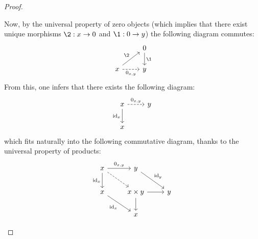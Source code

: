 \begin{proof}
\begin{enumerate}
                                    Now, by the universal property of zero objects (which implies that there exist unique morphisms $\2: x \to 0$ and $\1: 0 \to y$) the following diagram commutes:
                                        $$
                                            \begin{tikzcd}
                                                                                                   & 0 \arrow[d, "\1"] \\
                                                x \arrow[r, "{0_{x, y}}"', dashed] \arrow[ru, "\2"] & y                
                                            \end{tikzcd}
                                        $$
                                    From this, one infers that there exists the following diagram:
                                        $$
                                            \begin{tikzcd}
                                                x \arrow[r, "{0_{x, y}}", dashed] \arrow[d, "\id_x"'] & y \\
                                                x                                                     &  
                                            \end{tikzcd}
                                        $$
                                    which fits naturally into the following commutative diagram, thanks to the universal property of products:
                                        $$
                                            \begin{tikzcd}
                                            	x & y \\
                                            	x & {x \x y} & y \\
                                            	& x
                                            	\arrow["{0_{x, y}}", from=1-1, to=1-2]
                                            	\arrow["{\id_x}"', from=1-1, to=2-1]
                                            	\arrow[from=2-2, to=3-2]
                                            	\arrow[from=2-2, to=2-3]
                                            	\arrow["{\id_x}"', from=2-1, to=3-2]
                                            	\arrow["{\id_y}", from=1-2, to=2-3]
                                            	\arrow[dashed, from=1-1, to=2-2]
                                            \end{tikzcd}
                                        $$

\end{enumerate}
\end{proof}
